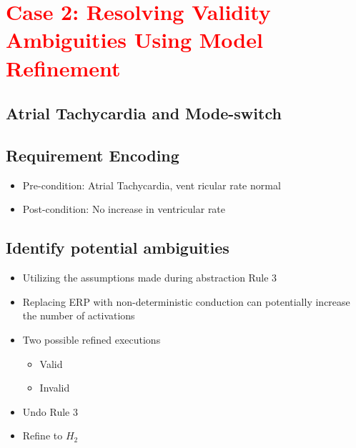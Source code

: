 \section{\textcolor{red}{Case 2: Resolving Validity Ambiguities Using Model Refinement}}
\label{resolvingValidityAmbiguities}
\subsection{Atrial Tachycardia and Mode-switch}
\subsection{Requirement Encoding}
\begin{itemize}
	\item Pre-condition: Atrial Tachycardia, vent  ricular rate normal
    \item Post-condition: No increase in ventricular rate
\end{itemize}
\subsection{Identify potential ambiguities}

\begin{itemize}
	\item Utilizing the assumptions made during abstraction Rule 3
    \item Replacing ERP with non-deterministic conduction can potentially increase the number of activations
    \item Two possible refined executions
    
\begin{itemize}
	\item Valid 
    \item Invalid
\end{itemize}
    \item Undo Rule 3
    \item Refine to $H_2$
\end{itemize}
